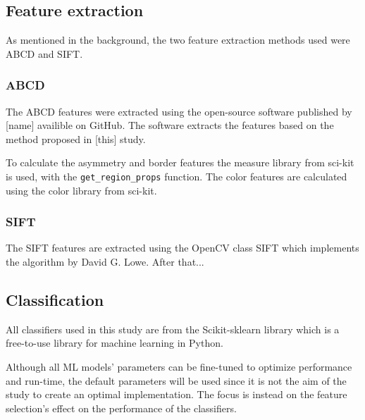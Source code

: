 \documentclass{kththesis}
\begin{document}
\subsection{Feature extraction}

As mentioned in the background, the two feature extraction methods used were ABCD and SIFT.

\subsubsection{ABCD}

The ABCD features were extracted using the open-source software published by [name] availible on GitHub. The software extracts the features based on the method proposed in [this] study. %

To calculate the asymmetry and border features the measure library from sci-kit is used, with the \verb|get_region_props| function. The color features are calculated using the color library from sci-kit.



\subsubsection{SIFT}

The SIFT features are extracted using the OpenCV class SIFT which implements the algorithm by David G. Lowe. %
After that...


\subsection{Classification}

All classifiers used in this study are from the Scikit-sklearn library which is a free-to-use library for machine learning in Python.%

Although all ML models’ parameters can be fine-tuned to optimize performance and run-time, the default parameters will be used since it is not the aim of the study to create an optimal implementation. The focus is instead on the feature selection’s effect on the performance of the classifiers.

\end{document}
